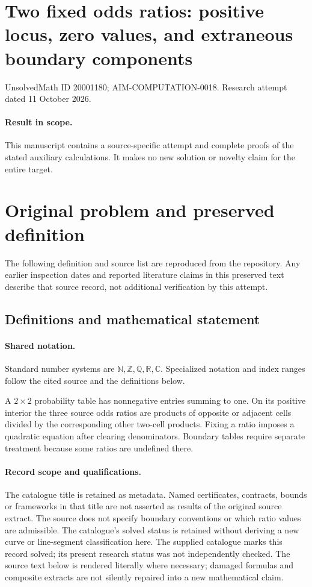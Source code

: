 \documentclass[11pt]{article}
\begin{document}
\section*{Two fixed odds ratios: positive locus, zero values, and extraneous boundary components}
\noindent UnsolvedMath ID 20001180; AIM-COMPUTATION-0018. Research attempt dated 11 October 2026.
\paragraph{Result in scope.}This manuscript contains a source-specific attempt and complete proofs of the stated auxiliary calculations. It makes no new solution or novelty claim for the entire target.
\section{Original problem and preserved definition}
The following definition and source list are reproduced from the repository. Any earlier inspection dates and reported literature claims in this preserved text describe that source record, not additional verification by this attempt.
\subsection{Definitions and mathematical statement}

\paragraph{Shared notation.}Standard number systems are $\mathbb N,\mathbb Z,\mathbb Q,\mathbb R,\mathbb C$. Specialized notation and index ranges follow the cited source and the definitions below.


A $2\times2$ probability table has nonnegative entries summing to one. On its positive interior the three source odds ratios are products of opposite or adjacent cells divided by the corresponding other two-cell products. Fixing a ratio imposes a quadratic equation after clearing denominators. Boundary tables require separate treatment because some ratios are undefined there.
\paragraph{Record scope and qualifications.}
The catalogue title is retained as metadata. Named certificates, contracts, bounds or frameworks in that title are not asserted as results of the original source extract.
The source does not specify boundary conventions or which ratio values are admissible. The catalogue's solved status is retained without deriving a new curve or line-segment classification here. The supplied catalogue marks this record solved; its present research status was not independently checked.
The source text below is rendered literally where necessary; damaged formulas and composite extracts are not silently repaired into a new mathematical claim.
\end{document}
